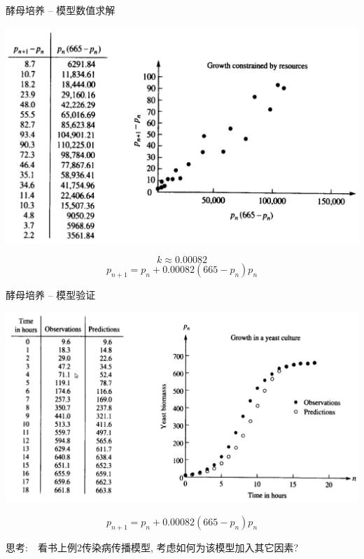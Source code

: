 \documentclass{beamer}
\begin{document}
\begin{frame}{酵母培养 -- 模型数值求解}
  \begin{center}
    \includegraphics[width=.8\textwidth{}]{yeast-fit.png}
  \end{center}
  \[
  k \approx 0.00082
  \]
  \[
  p_{n+1} = p_n + 0.00082(665 - p_n)p_n
  \]  
\end{frame}

\begin{frame}{酵母培养 -- 模型验证}
  \begin{center}
    \includegraphics[width=.8\textwidth{}]{yeast-verify.png}
  \end{center}
  \[
  p_{n+1} = p_n + 0.00082(665 - p_n)p_n
  \]

思考:　看书上例2传染病传播模型, 考虑如何为该模型加入其它因素?
\end{frame}
\end{document}
